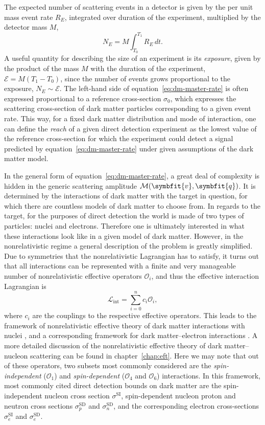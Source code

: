 \documentclass[b5paper, 10pt, twoside]{book}
\renewcommand{\vec}[1]{\symbfit{#1}}
\newcommand{\difd}{\,d}
\begin{document}
The expected number of scattering events in a detector is given by the per unit mass event rate $R_E$, integrated over duration of the experiment, multiplied by the detector mass $M$,
\begin{equation}
N_E=M\int_{T_0}^{T_1} R_E\difd t.
\end{equation}
A useful quantity for describing the size of an experiment is its \emph{exposure}, given by the product of the mass $M$ with the duration of the experiment, $\mathcal{E}=M(T_1-T_0)$, since the number of events grows proportional to the exposure, $N_E\sim\mathcal{E}$. The left-hand side of equation~\eqref{eq:dm-master-rate} is often expressed proportional to a reference cross-section $\sigma_0$, which expresses the scattering cross-section of dark matter particles corresponding to a given event rate. This way, for a fixed dark matter distribution and mode of interaction, one can define the \emph{reach} of a given direct detection experiment as the lowest value of the reference cross-section for which the experiment could detect a signal predicted by equation~\eqref{eq:dm-master-rate} under given assumptions of the dark matter model.

In the general form of equation~\eqref{eq:dm-master-rate}, a great deal of complexity is hidden in the generic scattering amplitude $\mathcal{M}(\vec{v},\vec{q})$. It is determined by the interactions of dark matter with the target in question, for which there are countless models of dark matter to choose from. In regards to the target, for the purposes of direct detection the world is made of two types of particles: nuclei and electrons. Therefore one is ultimately interested in what these interactions look like in a given model of dark matter. However, in the nonrelativistic regime a general description of the problem is greatly simplified. Due to symmetries that the nonrelativistic Lagrangian has to satisfy, it turns out that all interactions can be represented with a finite and very manageable number of nonrelativistic effective operators $\mathcal{O}_i$, and thus the effective interaction Lagrangian is
\begin{equation}
\mathcal{L}_\text{int}=\sum_{i=0}^{n}c_i\mathcal{O}_i,
\end{equation}
where $c_i$ are the couplings to the respective effective operators. This leads to the framework of nonrelativistic effective theory of dark matter interactions with nuclei \parencite{FitzpatrickEtAl2013}, and a corresponding framework for dark matter--electron interactions \parencites{CatenaEtAl2020, CatenaEtAl2021}. A more detailed discussion of the nonrelativistic effective theory of dark matter--nucleon scattering can be found in chapter~\ref{chap:eft}. Here we may note that out of these operators, two subsets most commonly considered are the \emph{spin-independent} ($\mathcal{O_1}$) and \emph{spin-dependent} ($\mathcal{O}_4$ and $\mathcal{O}_6$) interactions. In this framework, most commonly cited direct detection bounds on dark matter are the spin-independent nucleon cross section $\sigma^\text{SI}$, spin-dependent nucleon proton and neutron cross sections $\sigma_p^\text{SD}$ and $\sigma_n^\text{SD}$, and the corresponding electron cross-sections $\sigma_e^\text{SI}$ and $\sigma_e^\text{SD}$.
\end{document}
